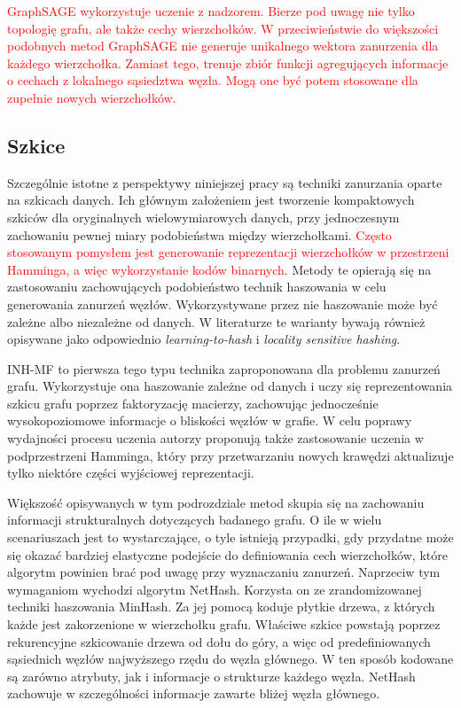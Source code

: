         \textcolor{red}{
        GraphSAGE\cite{DBLP:journals/corr/HamiltonYL17} wykorzystuje uczenie z nadzorem. Bierze pod uwagę nie tylko topologię grafu, ale także cechy wierzchołków. W przeciwieństwie do większości podobnych metod GraphSAGE nie generuje unikalnego wektora zanurzenia dla każdego wierzchołka. Zamiast tego, trenuje zbiór funkcji agregujących informacje o cechach z lokalnego sąsiedztwa węzła. Mogą one być potem stosowane dla zupełnie nowych wierzchołków.}
        
    \subsection{Szkice}
        Szczególnie istotne z perspektywy niniejszej pracy są techniki zanurzania oparte na szkicach danych. Ich głównym założeniem jest tworzenie kompaktowych szkiców dla oryginalnych wielowymiarowych danych, przy jednoczesnym zachowaniu pewnej miary podobieństwa między wierzchołkami. \textcolor{red}{Często stosowanym pomysłem jest generowanie reprezentacji wierzchołków w przestrzeni Hamminga\cite{Hamming_1950}, a więc wykorzystanie kodów binarnych}. Metody te opierają się na zastosowaniu zachowujących podobieństwo technik haszowania w celu generowania zanurzeń węzłów. Wykorzystywane przez nie haszowanie może być zależne albo niezależne od danych. W literaturze te warianty bywają również opisywane jako odpowiednio \emph{learning-to-hash} i \emph{locality sensitive hashing}\cite{wang2017survey}.  

        INH-MF\cite{Lian_Zheng_Zheng_Ge_Cao_Tsang_Xie_2018} to pierwsza tego typu technika zaproponowana dla problemu zanurzeń grafu. Wykorzystuje ona haszowanie zależne od danych i uczy się reprezentowania szkicu grafu poprzez faktoryzację macierzy, zachowując jednocześnie wysokopoziomowe informacje o bliskości węzłów w grafie. W celu poprawy wydajności procesu uczenia autorzy proponują także zastosowanie uczenia w podprzestrzeni Hamminga, który przy przetwarzaniu nowych krawędzi aktualizuje tylko niektóre części wyjściowej reprezentacji.
        
        Większość opisywanych w tym podrozdziale metod skupia się na zachowaniu informacji strukturalnych dotyczących badanego grafu. O ile w wielu scenariuszach jest to wystarczające, o tyle istnieją przypadki, gdy przydatne może się okazać bardziej elastyczne podejście do definiowania cech wierzchołków, które algorytm powinien brać pod uwagę przy wyznaczaniu zanurzeń. Naprzeciw tym wymaganiom wychodzi algorytm NetHash\cite{Wu_Li_Chen_Zhang_2018}. Korzysta on ze zrandomizowanej techniki haszowania MinHash. Za jej pomocą koduje płytkie drzewa, z których każde jest zakorzenione w wierzchołku grafu. Właściwe szkice powstają poprzez rekurencyjne szkicowanie drzewa od dołu do góry, a więc od predefiniowanych sąsiednich węzłów najwyższego rzędu do węzła głównego. W ten sposób kodowane są zarówno atrybuty, jak i informacje o strukturze każdego węzła. NetHash zachowuje w szczególności  informacje zawarte bliżej węzła głównego.
        
